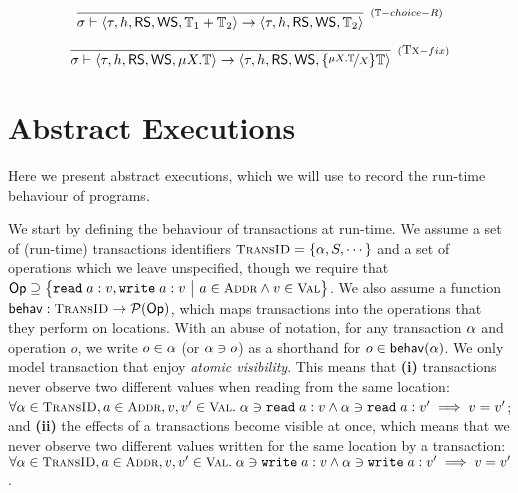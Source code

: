 \documentclass[a4paper,UKenglish]{article}%
\theoremstyle{plain}
\begin{document}
\[
\infer[{\scriptstyle{(\trans-choice-R)}}]{\thdstack \vdash \langle \txstack, \heap, \RS, \WS, \trans_1 + \trans_2 \rangle 
\rightarrow \langle  \txstack, \heap, \RS, \WS, \trans_2 \rangle}{}
\]

\[
\infer[{\scriptstyle{(\Tx-fix)}}]{\thdstack \vdash \langle \txstack, \heap, \RS, \WS, \mu X.\trans \rangle 
\rightarrow \langle  \txstack, \heap, \RS, \WS, \{\nicefrac{\mu X.\trans}{X}\}\trans \rangle}{}
\]

\section{Abstract Executions}
Here we present abstract executions, which we will use to record the 
run-time behaviour of programs. 

We start by defining the behaviour of transactions at run-time. 
We assume a set of (run-time) transactions identifiers $\TransID = \{\tsid, S , \cdots \}$ 
and a set of operations which we leave unspecified, though 
we require that $\Op \supseteq \Setcon{ \RD\;\addr :\val, \WR\;\addr :\val }{\addr \in \Addr \land \val \in \Val }$.
We also assume a function $\behav : \TransID \to \powerset{\Op}$, which maps 
transactions into the operations that they perform on locations. With an abuse of 
notation, for any transaction $\alpha$ and operation $o$, we write $o \in \alpha$ (or $\alpha \ni o$) as 
a shorthand for $o \in \mathsf{behav}(\alpha)$. 
We only model transaction that enjoy \emph{atomic visibility}. This 
means that \textbf{(i)} transactions never observe two different values when reading from 
the same location: $\for{ \tsid \in \TransID,  \addr \in \Addr,\val, \val' \in \Val }
\tsid\ni \RD\;\addr :\val \land \tsid \ni \RD\;\addr:\val' \implies \val = \val'$; and \textbf{(ii)} 
the effects of a transactions become visible at once, which means that we never observe
two different values written for the same location by a transaction: $\for{ \tsid \in \TransID, \addr \in \Addr, \val,\val' \in \Val } 
\tsid \ni \WR\;\addr: \val \land \tsid \ni \WR\;\addr:\val' \implies \val = \val'$.
\end{document}

